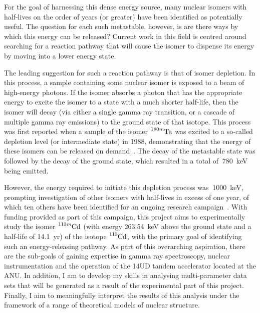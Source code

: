 \documentclass[12pt,a4paper]{article}
\begin{document}
\medskip
For the goal of harnessing this dense energy source, many nuclear isomers with half-lives on the order of years (or greater) have been identified as potentially useful. The question for each such metastable, however, is are there ways by which this energy can be released? Current work in this field is centred around searching for a reaction pathway that will cause the isomer to dispense its energy by moving into a lower energy state.

\medskip
The leading suggestion for such a reaction pathway is that of isomer depletion. In this process, a sample containing some nuclear isomer is exposed to a beam of high-energy photons. If the isomer absorbs a photon that has the appropriate energy to excite the isomer to a state with a much shorter half-life, then the isomer will decay (via either a single gamma ray transition, or a cascade of multiple gamma ray emissions) to the ground state of that isotope. This process was first reported when a sample of the isomer $\ce{^{180m}Ta}$ was excited to a so-called depletion level (or intermediate state) in 1988, demonstrating that the energy of these isomers can be released on demand~\cite{collins_depopulation_1988}. The decay of the metastable state was followed by the decay of the ground state, which resulted in a total of $~780$~keV being emitted. 

\medskip
However, the energy required to initiate this depletion process was $~$1000~keV, prompting investigation of other isomers with half-lives in excess of one year, of which ten others have been identified for an ongoing research campaign~\cite{shaffer_innovations_2018}. %
With funding provided as part of this campaign, this project aims to experimentally study the isomer $\ce{^{113m}Cd}$ (with energy 263.54~keV above the ground state and a half-life of 14.1~yr) of the isotope $\ce{^{113}Cd}$, with the primary goal of identifying such an energy-releasing pathway. As part of this overarching aspiration, there are the sub-goals of gaining expertise in gamma ray spectroscopy, nuclear instrumentation and the operation of the 14UD tandem accelerator located at the ANU. In addition, I am to develop my skills in analysing multi-parameter data sets that will be generated as a result of the experimental part of this project. Finally, I aim to meaningfully interpret the results of this analysis under the framework of a range of theoretical models of nuclear structure.

\end{document}
